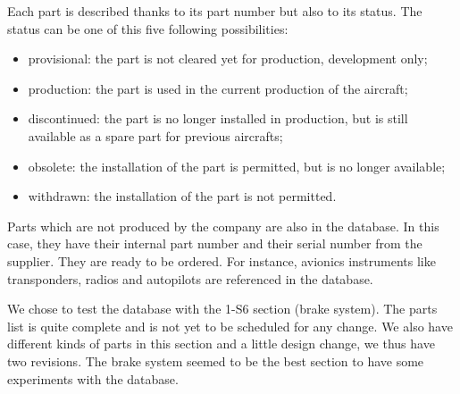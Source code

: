 \documentclass[11pt,a4paper]{article}
\newenvironment{fullpar}{\par\noindent\vtop\bgroup\hsize\linewidth\relax}{\egroup\par} %
\begin{document}
\begin{fullpar}
Each part is described thanks to its part number but also to its status. The status can be one of this five following possibilities:
\begin{itemize}
\setlength{\itemsep}{0pt}
\item provisional: the part is not cleared yet for production, development only;
\item production: the part is used in the current production of the aircraft;
\item discontinued: the part is no longer installed in production, but is still available as a spare part for previous aircrafts;
\item obsolete: the installation of the part is permitted, but is no longer available;
\item withdrawn: the installation of the part is not permitted.
\end {itemize}
\end{fullpar}

Parts which are not produced by the company are also in the database. In this case, they have their internal part number and their serial number from the supplier. They are ready to be ordered. For instance, avionics instruments like transponders, radios and autopilots are referenced in the database.

\bigskip

We chose to test the database with the 1-S6 section (brake system). The parts list is quite complete and is not yet to be scheduled for any change. We also have different kinds of parts in this section and a little design change, we thus have two revisions. The brake system seemed to be the best section to have some experiments with the database.

\bigskip
\end{document}
